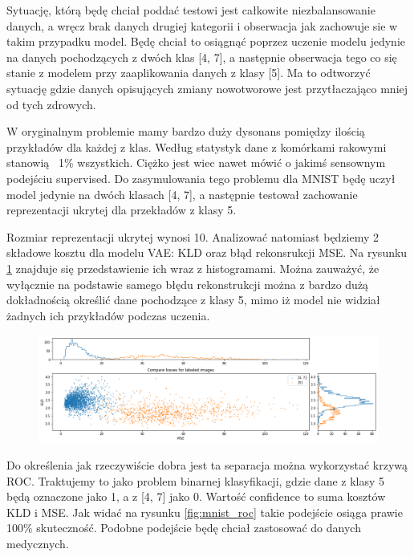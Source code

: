 Sytuację, którą będę chciał poddać testowi jest całkowite niezbalansowanie danych, a wręcz brak danych drugiej kategorii i obserwacja jak zachowuje sie w takim przypadku model. Będę chciał to osiągnąć poprzez uczenie modelu jedynie na danych pochodzących z dwóch klas [4, 7], a następnie obserwacja tego co się stanie z modelem przy zaaplikowania danych z klasy [5]. Ma to odtworzyć sytuację gdzie danych opisujących zmiany nowotworowe jest przytłaczająco mniej od tych zdrowych.

W oryginalnym problemie mamy bardzo duży dysonans pomiędzy ilością przykładów dla każdej z klas. Według statystyk dane z komórkami rakowymi stanowią ~1\% wszystkich. Ciężko jest wiec nawet mówić o jakimś sensownym podejściu supervised. Do zasymulowania tego problemu dla MNIST będę uczył model jedynie na dwóch klasach [4, 7], a następnie testował zachowanie reprezentacji ukrytej dla przekładów z klasy 5.

Rozmiar reprezentacji ukrytej wynosi 10. Analizować natomiast będziemy 2 składowe kosztu dla modelu VAE: KLD oraz błąd rekonsrukcji MSE. Na rysunku \ref{fig:mnist_compare} znajduje się przedstawienie ich wraz z histogramami. Można zauważyć, że wyłącznie na podstawie samego błędu rekonstrukcji można z bardzo dużą dokładnością określić dane pochodzące z klasy 5, mimo iż model nie widział żadnych ich przykładów podczas uczenia.

\begin{figure}[h!]
    \centering
    \includegraphics[width=1.0\textwidth]{images/mnist_compare}
    \caption{}
    \label{fig:mnist_compare}
\end{figure}

Do określenia jak rzeczywiście dobra jest ta separacja można wykorzystać krzywą ROC. Traktujemy to jako problem binarnej klasyfikacji, gdzie dane z klasy 5 będą oznaczone jako 1, a z [4, 7] jako 0. Wartość confidence to suma kosztów KLD i MSE. Jak widać na rysunku \ref{fig:mnist_roc} takie podejście osiąga prawie 100\% skuteczność. Podobne podejście będę chciał zastosować do danych medycznych.

